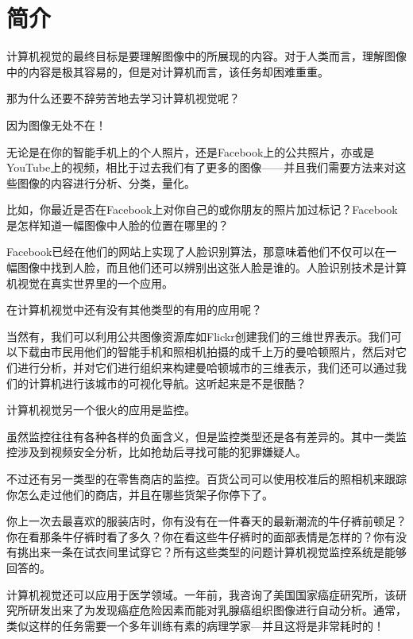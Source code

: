 \documentclass[color=green,mathpazo,titlestyle=hang]{elegantbook}
\author{袁勇}
\begin{document}
\maketitle
\tableofcontents
\mainmatter

\chapter{简介}

计算机视觉的最终目标是要理解图像中的所展现的内容。对于人类而言，理解图像中的内容是极其容易的，但是对计算机而言，该任务却困难重重。

那为什么还要不辞劳苦地去学习计算机视觉呢？

因为图像无处不在！

无论是在你的智能手机上的个人照片，还是Facebook上的公共照片，亦或是YouTube上的视频，相比于过去我们有了更多的图像——并且我们需要方法来对这些图像的内容进行分析、分类，量化。

比如，你最近是否在Facebook上对你自己的或你朋友的照片加过标记？Facebook是怎样知道一幅图像中人脸的位置在哪里的？

Facebook已经在他们的网站上实现了人脸识别算法，那意味着他们不仅可以在一幅图像中找到人脸，而且他们还可以辨别出这张人脸是谁的。人脸识别技术是计算机视觉在真实世界里的一个应用。

在计算机视觉中还有没有其他类型的有用的应用呢？

当然有，我们可以利用公共图像资源库如Flickr创建我们的三维世界表示。我们可以下载由市民用他们的智能手机和照相机拍摄的成千上万的曼哈顿照片，然后对它们进行分析，并对它们进行组织来构建曼哈顿城市的三维表示，我们还可以通过我们的计算机进行该城市的可视化导航。这听起来是不是很酷？

计算机视觉另一个很火的应用是监控。

虽然监控往往有各种各样的负面含义，但是监控类型还是各有差异的。其中一类监控涉及到视频安全分析，比如抢劫后寻找可能的犯罪嫌疑人。

不过还有另一类型的在零售商店的监控。百货公司可以使用校准后的照相机来跟踪你怎么走过他们的商店，并且在哪些货架子你停下了。

你上一次去最喜欢的服装店时，你有没有在一件春天的最新潮流的牛仔裤前顿足？你在看那条牛仔裤时看了多久？你在看这些牛仔裤时的面部表情是怎样的？你有没有挑出来一条在试衣间里试穿它？所有这些类型的问题计算机视觉监控系统是能够回答的。

计算机视觉还可以应用于医学领域。一年前，我咨询了美国国家癌症研究所，该研究所研发出来了为发现癌症危险因素而能对乳腺癌组织图像进行自动分析。通常，类似这样的任务需要一个多年训练有素的病理学家—并且这将是非常耗时的！
\end{document}
